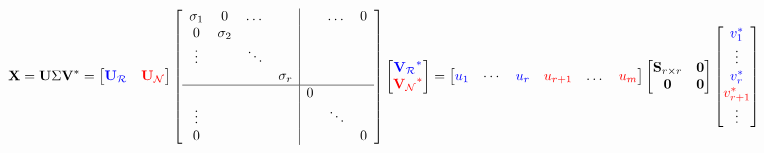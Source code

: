 \documentclass[14pt]{article}
\theoremstyle{definition}
\theoremstyle{remark}
\begin{document}
\begin{align*}
    \mathbf{X} = \mathbf{U}  \Sigma  \mathbf{V}^{*}
     & =
    \begin{bmatrix}
        \color{blue}{\mathbf{U}_{\mathcal{R}}} & \color{red}{\mathbf{U}_{\mathcal{N}}}
    \end{bmatrix}
    \begin{bmatrix}
        \begin{array}{cccc|ccc}
            \sigma_{1} & 0          & \dots  &            &   & \dots  & 0 \\
            0          & \sigma_{2} &        &            &   &        &   \\
            \vdots     &            & \ddots &            &   &        &   \\
                       &            &        & \sigma_{r} &   &        &   \\\hline
                       &            &        &            & 0 &        &   \\
            \vdots     &            &        &            &   & \ddots &   \\
            0          &            &        &            &   &        & 0 \\
        \end{array}
    \end{bmatrix}
    \begin{bmatrix}
        \color{blue}{\mathbf{V}_{\mathcal{R}}}^{*} \\
        \color{red}{\mathbf{V}_{\mathcal{N}}}^{*}
    \end{bmatrix}
    =
    \begin{bmatrix}
        \color{blue}{u_{1}} & \cdots & \color{blue}{u_{r}} & \color{red}{u_{r+1}} & \dots & \color{red}{u_{m}}
    \end{bmatrix}
    \begin{bmatrix}
        \mathbf{S}_{r\times r} & \mathbf{0} \\
        \mathbf{0}             & \mathbf{0}
    \end{bmatrix}
    \begin{bmatrix}
        \color{blue}{v_{1}^{*}}  \\
        \vdots                   \\
        \color{blue}{v_{r}^{*}}  \\
        \color{red}{v_{r+1}^{*}} \\
        \vdots                   \\

\end{bmatrix}
\end{align*}
\end{document}
